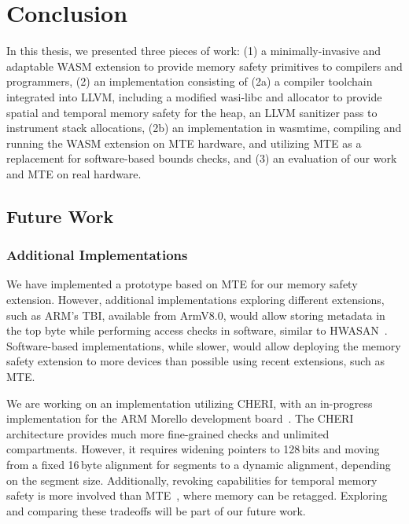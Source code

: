 \chapter{Conclusion}
\label{ch:conclusion}

In this thesis, we presented three pieces of work:
(1) a minimally-invasive and adaptable \ac{WASM} extension to provide memory safety primitives to compilers and programmers,
(2) an implementation consisting of (2a) a compiler toolchain integrated into LLVM, including a modified wasi-libc and allocator to provide spatial and temporal memory safety for the heap, an LLVM sanitizer pass to instrument stack allocations,
(2b) an implementation in wasmtime, compiling and running the \ac{WASM} extension on \ac{MTE} hardware, and utilizing \ac{MTE} as a replacement for software-based bounds checks,
and (3) an evaluation of our work and \ac{MTE} on real hardware.

\section{Future Work}
\label{sec:future-work}

\subsection{Additional Implementations}
\label{subsec:additional-implementations}

We have implemented a prototype based on \ac{MTE} for our memory safety extension.
However, additional implementations exploring different extensions, such as ARM's \ac{TBI}, available from ArmV8.0, would allow storing metadata in the top byte while performing access checks in software, similar to \ac{HWASAN}~\cite{serebryany2018memory}.
Software-based implementations, while slower, would allow deploying the memory safety extension to more devices than possible using recent extensions, such as \ac{MTE}.

We are working on an implementation utilizing \ac{CHERI}, with an in-progress implementation for the ARM Morello development board~\cite{UCAM-CL-TR-982}.
The CHERI architecture provides much more fine-grained checks and unlimited compartments.
However, it requires widening pointers to 128\,bits and moving from a fixed 16\,byte alignment for segments to a dynamic alignment, depending on the segment size.
Additionally, revoking capabilities for temporal memory safety is more involved than \ac{MTE}~\cite{xia2019cherivoke}, where memory can be retagged.
Exploring and comparing these tradeoffs will be part of our future work.

